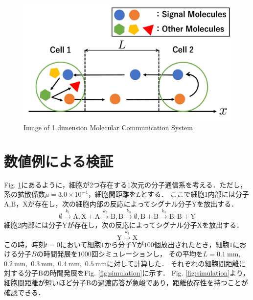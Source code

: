 \documentclass[twocolumn]{jarticle}
\begin{document}

\begin{figure}[tb]
    \centering
    \includegraphics[width=\columnwidth] {figures/Images.pdf}
    \caption{Image of 1 dimension Molecular Communication System}
    \label{fig:image}
\end{figure}


\section{数値例による検証}
Fig. \ref{fig:image}にあるように，細胞が2つ存在する1次元の分子通信系を考える．ただし，系の拡散係数$\mu=$$3.0\times10^{-4}$，細胞間距離を$L$とする．
ここで細胞1内部には分子$\mathrm{A}$,$\mathrm{B}$，$\mathrm{X}$が存在し，次の細胞内部の反応によってシグナル分子$\mathrm{Y}$を放出する．
\begin{equation}
    \emptyset \xrightarrow{k_1} \mathrm{A},\mathrm{X}+\mathrm{A} \xrightarrow{k_2} \mathrm{B}, \mathrm{B} \xrightarrow{k_3} \emptyset, \mathrm{B}+\mathrm{B}\xrightarrow{k_3} \mathrm{B:B} +\mathrm{Y}
\end{equation}
細胞2内部には分子$\mathrm{Y}$が存在し，次の反応によってシグナル分子$\mathrm{X}$を放出する．
\begin{equation}
    \mathrm{Y} \xrightarrow{k_4} \mathrm{X}
\end{equation}
この時，時刻$t=0$において細胞$1$から分子$\mathrm{Y}$が$100$個放出されたとき，細胞$1$における分子$B$の時間発展を$1000$回シミュレーションし，
その平均を$L=\SI{0.1}{\milli\meter},$ $\SI{0.2}{\milli\meter},$ $\SI{0.3}{\milli\meter},$ $\SI{0.4}{\milli\meter},$ $\SI{0.5}{\milli\meter}$に対して計算した．
それぞれの細胞間距離に対する分子Bの時間発展をFig. \ref{fig:simulation}に示す．
Fig. \ref{fig:simulation}より，細胞間距離が短いほど分子Bの過渡応答が急峻であり，距離依存性を持つことが確認できる．
\end{document}
